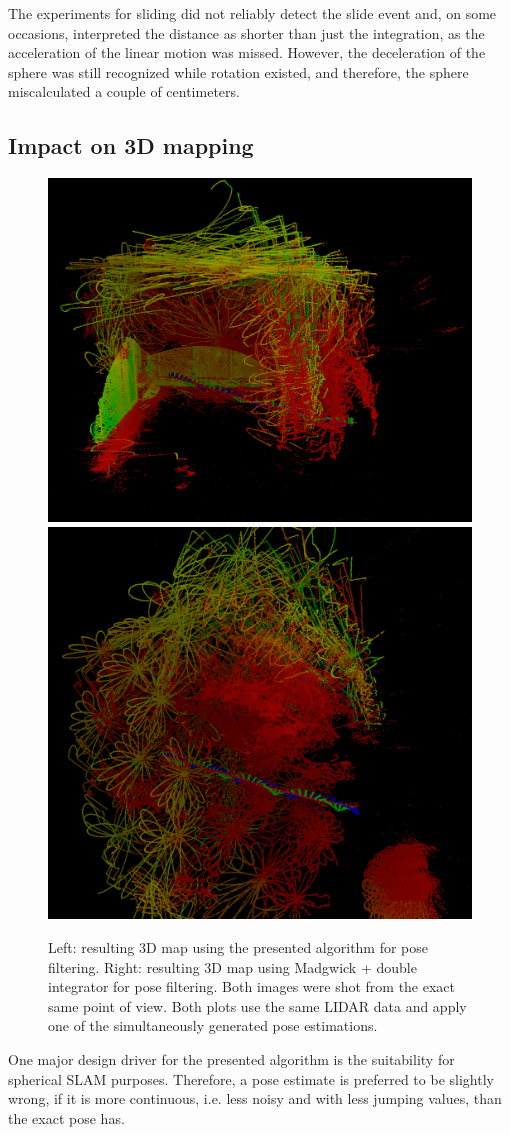 \documentclass[letterpaper, 10 pt, conference]{ieeeconf}  %
\begin{document}
The experiments for sliding did not reliably detect the slide event and, on some occasions, interpreted the distance as shorter than just the integration, as the acceleration of the linear motion was missed.
However, the deceleration of the sphere was still recognized while rotation existed, and therefore, the sphere miscalculated a couple of centimeters.


\subsection{Impact on 3D mapping}

\begin{figure}
\includegraphics[width=0.52\linewidth]{./graphics/jasperhome1.png} 
\includegraphics[width=0.45\linewidth]{./graphics/jasperhome1madw.png}
\caption{Left: resulting 3D map using the presented algorithm for pose filtering. Right: resulting 3D map using Madgwick + double integrator for pose filtering. Both images were shot from the exact same point of view. Both plots use the same LIDAR data and apply one of the simultaneously generated pose estimations.}
\label{fig:mapping}
\end{figure}

One major design driver for the presented algorithm is the suitability for spherical SLAM purposes.
Therefore, a pose estimate is preferred to be slightly wrong, if it is more continuous, i.e. less noisy and with less jumping values, than the exact pose has.
\end{document}
